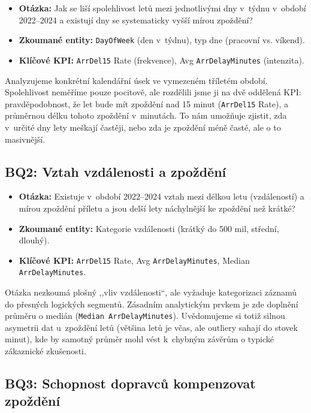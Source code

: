 \documentclass{protokol}
\begin{document}
\begin{itemize}
    \item \textbf{Otázka:} Jak se liší spolehlivost letů mezi jednotlivými dny v~týdnu v~období 2022--2024 a existují dny se systematicky vyšší mírou zpoždění?
    \item \textbf{Zkoumané entity:} \texttt{DayOfWeek} (den v~týdnu), typ dne (pracovní vs. víkend).
    \item \textbf{Klíčové KPI:} \texttt{ArrDel15} Rate (frekvence), Avg \texttt{ArrDelayMinutes} (intenzita).
\end{itemize}

Analyzujeme konkrétní kalendářní úsek ve vymezeném tříletém období. Spolehlivost neměříme pouze pocitově, ale rozdělili jsme ji na dvě oddělená KPI: pravděpodobnost, že let bude mít zpoždění nad 15 minut (\texttt{ArrDel15} Rate), a průměrnou délku tohoto zpoždění v~minutách. To nám umožňuje zjistit, zda v~určité dny lety meškají častěji, nebo zda je zpoždění méně časté, ale o to masivnější.

\subsection{BQ2: Vztah vzdálenosti a zpoždění}

\begin{itemize}
    \item \textbf{Otázka:} Existuje v~období 2022--2024 vztah mezi délkou letu (vzdáleností) a mírou zpoždění příletu a jsou delší lety náchylnější ke zpoždění než krátké?
    \item \textbf{Zkoumané entity:} Kategorie vzdálenosti (krátký do 500 mil, střední, dlouhý).
    \item \textbf{Klíčové KPI:} \texttt{ArrDel15} Rate, Avg \texttt{ArrDelayMinutes}, Median \texttt{ArrDelayMinutes}.
\end{itemize}

Otázka nezkoumá plošný ,,vliv vzdálenosti``, ale vyžaduje kategorizaci záznamů do přesných logických segmentů. Zásadním analytickým prvkem je zde doplnění průměru o medián (\texttt{Median ArrDelayMinutes}). Uvědomujeme si totiž silnou asymetrii dat u~zpoždění letů (většina letů je včas, ale outliery sahají do stovek minut), kde by samotný průměr mohl vést k~chybným závěrům o typické zákaznické zkušenosti.

\subsection{BQ3: Schopnost dopravců kompenzovat zpoždění}
\end{document}

